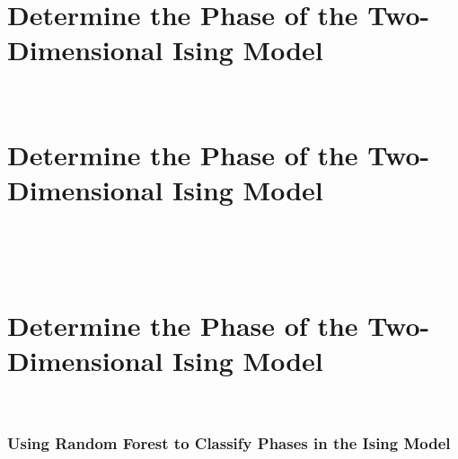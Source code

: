\documentclass[11pt]{article}
\begin{document}
\newpage
\hypertarget{determine-the-phase-of-the-two-dimensional-ising-model}{%
\section*{Determine the Phase of the Two-Dimensional Ising
Model}\label{determine-the-phase-of-the-two-dimensional-ising-model}}

    \begin{center}
    \end{center}
    { \hspace*{\fill} \\}

\newpage
\hypertarget{determine-the-phase-of-the-two-dimensional-ising-model}{%
\section*{Determine the Phase of the Two-Dimensional Ising
Model}\label{determine-the-phase-of-the-two-dimensional-ising-model2}}

    \begin{center}
    \end{center}
    { \hspace*{\fill} \\}

    \begin{center}
    \end{center}
    { \hspace*{\fill} \\}

\newpage
\hypertarget{determine-the-phase-of-the-two-dimensional-ising-model}{%
\section*{Determine the Phase of the Two-Dimensional Ising
Model}\label{determine-the-phase-of-the-two-dimensional-ising-model4}}

    \begin{center}
    \end{center}
    { \hspace*{\fill} \\}

\newpage
\hypertarget{using-random-forest-to-classify-phases-in-the-ising-model}{%
\subsubsection{Using Random Forest to Classify Phases in the Ising
Model}\label{using-random-forest-to-classify-phases-in-the-ising-model}}
\end{document}
